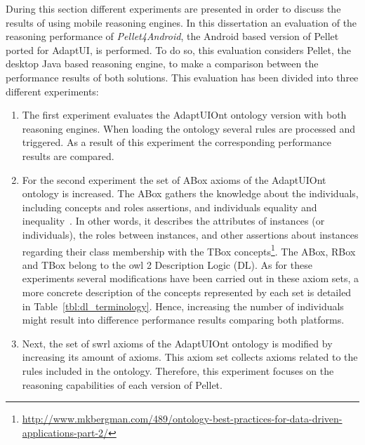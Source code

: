 During this section different experiments are presented in order to 
discuss the results of using mobile reasoning engines. In this dissertation an
evaluation of the reasoning performance of \textit{Pellet4Android}, the Android
based version of Pellet ported for AdaptUI, is performed. To do so, this evaluation
considers Pellet, the desktop Java based reasoning engine, to make a comparison
between the performance results of both solutions. This evaluation has been
divided into three different experiments:

\begin{enumerate}
  \item The first experiment evaluates the AdaptUIOnt ontology version with both 
  reasoning engines. When loading the ontology several rules are processed and 
  triggered. As a result of this experiment the corresponding performance 
  results are compared.
  
  \item For the second experiment the set of ABox axioms of the AdaptUIOnt 
  ontology is increased. The ABox gathers the knowledge about the 
  individuals, including concepts and roles assertions, and individuals 
  equality and inequality~\citep{krotzsch_description_2012}. In other words, 
  it describes the attributes of instances (or individuals), the roles between 
  instances, and other assertions about instances regarding their class 
  membership with the TBox concepts\footnote{\url{http://www.mkbergman.com/489/ontology-best-practices-for-data-driven-applications-part-2/}}. The ABox, RBox and TBox 
  belong to the \ac{owl} 2 Description Logic (DL). As for these experiments several 
  modifications have been carried out in these axiom sets, a more concrete 
  description of the concepts represented by each set is detailed in 
  Table~\ref{tbl:dl_terminology}. Hence, increasing the number of individuals   
  might result into difference performance results comparing both platforms.
  
  \item Next, the set of \ac{swrl} axioms of the AdaptUIOnt ontology is modified 
  by increasing its amount of axioms. This axiom set collects axioms related to 
  the rules included in the ontology. Therefore, this experiment focuses on the 
  reasoning capabilities of each version of Pellet.
\end{enumerate}



